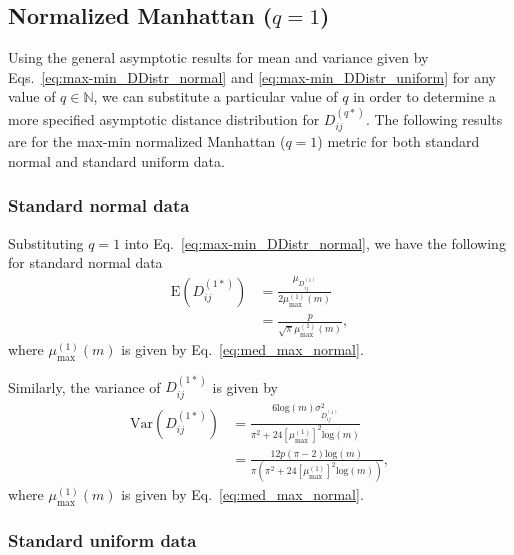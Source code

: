 \documentclass[10pt,letterpaper]{article}\usepackage[]{graphicx}\usepackage[]{color}
\begin{document}
\subsection{Normalized Manhattan \texorpdfstring{($q=1$)}{}}

Using the general asymptotic results for mean and variance given by Eqs.~\ref{eq:max-min_DDistr_normal} and \ref{eq:max-min_DDistr_uniform} for any value of $q \in \mathbb{N}$, we can substitute a particular value of $q$ in order to determine a more specified asymptotic distance distribution for $D^{(q*)}_{ij}$. The following results are for the max-min normalized Manhattan ($q = 1$) metric for both standard normal and standard uniform data.

\subsubsection{Standard normal data}

Substituting $q=1$ into Eq.~\ref{eq:max-min_DDistr_normal}, we have the following for standard normal data
%
\begin{equation}\label{eq:max-min_manhattan_normal_mean}
\begin{aligned}
\text{E}\left(D^{(1*)}_{ij}\right) &= \frac{\mu_{D^{(1)}_{ij}}}{2\mu^{(1)}_\text{max}(m)} \\
&= \frac{p}{\sqrt{\pi}\mu^{(1)}_\text{max}(m)},
\end{aligned}
\end{equation}
where $\mu^{(1)}_\text{max}(m)$ is given by Eq.~\ref{eq:med_max_normal}.

Similarly, the variance of $D^{(1*)}_{ij}$ is given by
%
\begin{equation}\label{eq:max-min_manhattan_normal_var}
\begin{aligned}
\text{Var}\left(D^{(1*)}_{ij}\right) &= \frac{6\text{log}(m)\sigma^2_{D^{(1)}_{ij}}}{\pi^2 + 24\left[\mu^{(1)}_\text{max}\right]^2\text{log}(m)} \\
&= \frac{12p(\pi-2)\text{log}(m)}{\pi\left(\pi^2 + 24\left[\mu^{(1)}_\text{max}\right]^2\text{log}(m)\right)},
\end{aligned}
\end{equation}
where $\mu^{(1)}_\text{max}(m)$ is given by Eq.~\ref{eq:med_max_normal}.

\subsubsection{Standard uniform data}
\end{document}
